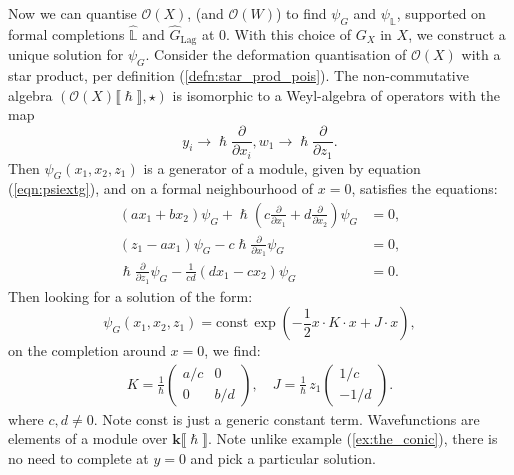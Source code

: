    Now we can quantise \( \mathcal{O}(X)\), (and \( \mathcal{O}(W)\)) to find \( \psi_G\) and \( \psi_{\mathbb{L}}\), supported on formal completions \( \widehat{\mathbb{L}}\) and \( \widehat{G}_{\mathrm{Lag}}\) at \(0\). With this choice of \(G_X\) in \(X\), we construct a unique solution for \(\psi_G\).
    Consider the deformation quantisation of \( \mathcal{O}(X)\) with a star product, per definition (\ref{defn:star_prod_pois}). The non-commutative algebra \((\mathcal{O}(X)\lBrack \hslash \rBrack, \star)\) is isomorphic to a Weyl-algebra of operators with the map \[y_i \rightarrow \hslash \frac{\partial}{\partial x_i},  w_1 \rightarrow \hslash \frac{\partial}{\partial z_1}.\] 
    Then \( \psi_G(x_1,x_2,z_1)\) is a generator of a module, given by equation (\ref{eqn:psiextg}), and on a formal neighbourhood of \(x=0\), satisfies the equations: 
    \begin{align*}
       (a x_1 + b x_2) \psi_G + \hslash \left( c \frac{\partial}{\partial x_1 } +  d \frac{\partial}{\partial x_2} \right) \psi_G & = 0, \\
       ( z_1 - a x_1 ) \psi_G  - c \hslash \frac{\partial}{\partial x_1} \psi_G &= 0, \\ 
       \hslash \frac{\partial}{\partial z_1} \psi_G - \frac{1}{c d} ( d x_1 - c x_2) \psi_G &= 0.
    \end{align*}
    Then looking for a solution of the form:
    \[ \psi_G (x_1,x_2,z_1)= \mathrm{const} \, \exp\left( -\frac{1}{2} x \cdot K \cdot x  + J  \cdot x\right),\]
    on the completion around \(x=0\), we find: 
    \begin{align*}
        K = \frac{1}{\hslash} \left(\begin{array}{cc}
            a/c & 0 \\
            0 & b/d
        \end{array}\right), \quad J = \frac{1}{\hslash} \,  z_1 \left( \begin{array}{c}
            1/c \\
            -1/d
        \end{array}\right).
    \end{align*}
    where \( c , d \neq 0\). Note \( \mathrm{const}\) is just a generic constant term. Wavefunctions are elements of a module over \(\mathbf{k} \lBrack \hslash \rBrack\). Note unlike example (\ref{ex:the_conic}), there is no need to complete at \(y=0\) and pick a particular solution.
    

